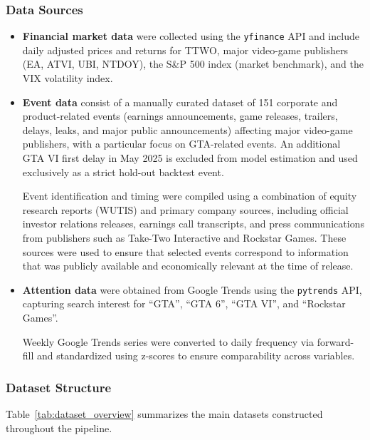\documentclass[11pt,a4paper]{article}
\begin{document}
\subsubsection{Data Sources}

\begin{itemize}[topsep=2pt]
    \item \textbf{Financial market data} were collected using the \texttt{yfinance} API and include daily adjusted prices and returns for TTWO, major video-game publishers (EA, ATVI, UBI, NTDOY), the S\&P 500 index (market benchmark), and the VIX volatility index.
    \item \textbf{Event data} consist of a manually curated dataset of 151 corporate and product-related events (earnings announcements, game releases, trailers, delays, leaks, and major public announcements) affecting major video-game publishers, with a particular focus on GTA-related events. An additional GTA VI first delay in May 2025 is excluded from model estimation and used exclusively as a strict hold-out backtest event.

Event identification and timing were compiled using a combination of equity research reports (WUTIS) and primary company sources, including official investor relations releases, earnings call transcripts, and press communications from publishers such as Take-Two Interactive and Rockstar Games. These sources were used to ensure that selected events correspond to information that was publicly available and economically relevant at the time of release.

    \item \textbf{Attention data} were obtained from Google Trends using the \texttt{pytrends} API, capturing search interest for ``GTA'', ``GTA 6'', ``GTA VI'', and ``Rockstar Games''.

    Weekly Google Trends series were converted to daily frequency via forward-fill and standardized using z-scores to ensure comparability across variables.
\end{itemize}



\subsubsection{Dataset Structure}

Table~\ref{tab:dataset_overview} summarizes the main datasets constructed throughout the pipeline.
\end{document}
